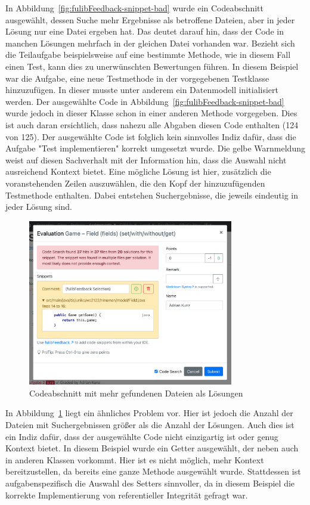 In Abbildung~\ref{fig:fulibFeedback-snippet-bad} wurde ein Codeabschnitt ausgewählt, dessen Suche mehr Ergebnisse als betroffene Dateien, aber in jeder Lösung nur eine Datei ergeben hat.
Das deutet darauf hin, dass der Code in manchen Lösungen mehrfach in der gleichen Datei vorhanden war.
Bezieht sich die Teilaufgabe beispielsweise auf eine bestimmte Methode, wie in diesem Fall einen Test, kann dies zu unerwünschten Bewertungen führen.
In diesem Beispiel war die Aufgabe, eine neue Testmethode in der vorgegebenen Testklasse  hinzuzufügen.
In dieser musste unter anderem ein Datenmodell initialisiert werden.
Der ausgewählte Code in Abbildung~\ref{fig:fulibFeedback-snippet-bad} wurde jedoch in dieser Klasse schon in einer anderen Methode vorgegeben.
Dies ist auch daran ersichtlich, dass nahezu alle Abgaben diesen Code enthalten (124 von 125).
Der ausgewählte Code ist folglich kein sinnvolles Indiz dafür, dass die Aufgabe "Test implementieren" korrekt umgesetzt wurde.
Die gelbe Warnmeldung weist auf diesen Sachverhalt mit der Information hin, dass die Auswahl nicht ausreichend Kontext bietet.
Eine mögliche Lösung ist hier, zusätzlich die voranstehenden Zeilen auszuwählen, die den Kopf der hinzuzufügenden Testmethode enthalten.
Dabei entstehen Suchergebnisse, die jeweils eindeutig in jeder Lösung sind.

\begin{figure}
    \centering
    \includegraphics[width=0.8\textwidth]{images/fulibFeedback-snippet-worst}
    \caption{Codeabschnitt mit mehr gefundenen Dateien als Lösungen}
    \label{fig:fulibFeedback-snippet-worst}
\end{figure}

In Abbildung~\ref{fig:fulibFeedback-snippet-worst} liegt ein ähnliches Problem vor.
Hier ist jedoch die Anzahl der Dateien mit Suchergebnissen größer als die Anzahl der Lösungen.
Auch dies ist ein Indiz dafür, dass der ausgewählte Code nicht einzigartig ist oder genug Kontext bietet.
In diesem Beispiel wurde ein Getter ausgewählt, der neben  auch in anderen Klassen vorkommt.
Hier ist es nicht möglich, mehr Kontext bereitzustellen, da bereits eine ganze Methode ausgewählt wurde.
Stattdessen ist aufgabenspezifisch die Auswahl des Setters sinnvoller, da in diesem Beispiel die korrekte Implementierung von referentieller Integrität gefragt war.

